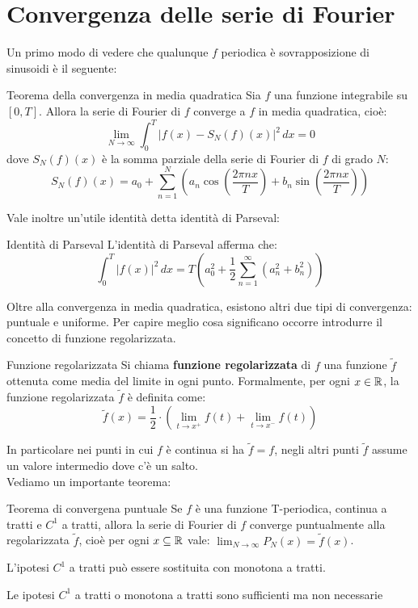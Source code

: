 \section{Convergenza delle serie di Fourier}
Un primo modo di vedere che qualunque $f$ periodica è sovrapposizione di sinusoidi è il seguente:
\begin{teorema}{Teorema della convergenza in media quadratica}
  Sia $f$ una funzione integrabile su $[0, T]$. Allora la serie di Fourier di $f$ converge a $f$ in media quadratica, cioè:
  $$
  \lim_{N \to \infty} \int_{0}^{T} \left| f(x) - S_N(f)(x) \right|^2 \, dx = 0
  $$
  dove $S_N(f)(x)$ è la somma parziale della serie di Fourier di $f$ di grado $N$:
  $$
  S_N(f)(x) = a_0 + \sum_{n=1}^{N} \left( a_n \cos\left(\frac{2\pi nx}{T}\right) + b_n \sin\left(\frac{2\pi nx}{T}\right) \right)
  $$
\end{teorema}
Vale inoltre un'utile identità detta identità di Parseval:
\begin{osservazione}{Identità di Parseval}
  L'identità di Parseval afferma che:
  $$
  \int_{0}^{T} \left| f(x) \right|^2 \, dx = T \left( a_0^2 + \frac{1}{2} \sum_{n=1}^{\infty} \left( a_n^2 + b_n^2 \right) \right)
  $$
\end{osservazione}
Oltre alla convergenza in media quadratica, esistono altri due tipi di convergenza: puntuale e uniforme. Per capire meglio cosa significano occorre introdurre il concetto di funzione regolarizzata.
\begin{definizione}{Funzione regolarizzata}
  Si chiama \textbf{funzione regolarizzata} di $f$ una funzione $\tilde{f}$ ottenuta come media del limite in ogni punto. Formalmente, per ogni $x \in \mathbb{R}$, la funzione regolarizzata $\tilde{f}$ è definita come:
  $$
  \tilde{f}(x) = \frac{1}{2}\cdot (\lim_{t \to x^+} f(t)+\lim_{t \to x^-} f(t))
  $$

\end{definizione}
In particolare nei punti in cui $f$ è continua si ha $\tilde{f}=f$, negli altri punti $\tilde{f}$ assume un valore intermedio dove c'è un salto.\\
Vediamo un importante teorema:
\begin{teorema}{Teorema di convergena puntuale}
  Se $f$ è una funzione T-periodica, continua a tratti e $C^1$ a tratti, allora la serie di Fourier di $f$ converge puntualmente alla regolarizzata $\tilde{f}$, cioè per ogni $x \subseteq \mathbb{R}$ vale: $\lim_{N \to \infty} P_N(x) = \tilde{f}(x)$.
\end{teorema}

L'ipotesi $C^1$ a tratti può essere sostituita con monotona a tratti.
\begin{osservazione}{}
  Le ipotesi $C^1$ a tratti o monotona a tratti sono sufficienti ma non necessarie
\end{osservazione}

